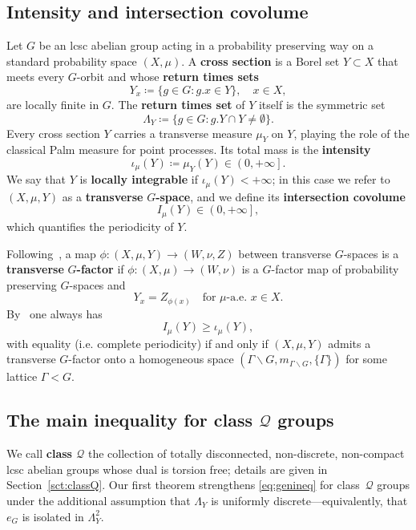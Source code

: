 \documentclass{amsart}
\numberwithin{equation}{subsection}
\theoremstyle{remark}
\begin{document}
\subsection{Intensity and intersection covolume}

Let \(G\) be an lcsc abelian group acting in a probability preserving way on a standard probability space \(\left(X,\mu\right)\). A {\bf cross section} is a Borel set \(Y\subset X\) that meets every \(G\)-orbit and whose {\bf return times sets} 
\[\left.Y_{x}\coloneqq\{g\in G: g.x\in Y\}, \quad x\in X,\right.\] 
are locally finite in \(G\). The {\bf return times set} of \(Y\) itself is the symmetric set 
\[\Lambda_{Y}\coloneqq\{g\in G: g.Y\cap Y\neq\emptyset\}.\] 
Every cross section \(Y\) carries a transverse measure \(\mu_{Y}\) on \(Y\), playing the role of the classical Palm measure for point processes. Its total mass is the {\bf intensity} 
\[\iota_{\mu}\left(Y\right)\coloneqq\mu_{Y}\left(Y\right)\in\left(0,+\infty\right].\] 
We say that \(Y\) is {\bf locally integrable} if \(\iota_{\mu}\left(Y\right)<+\infty\); in this case we refer to \(\left(X,\mu,Y\right)\) as a {\bf transverse} \(G\){\bf-space}, and we define its {\bf intersection covolume} 
\[I_{\mu}\left(Y\right)\in\left(0,+\infty\right],\] 
which quantifies the periodicity of \(Y\).

Following~\cite[\S5.2]{AvBjCuI}, a map \(\phi:\left(X,\mu,Y\right)\to\left(W,\nu,Z\right)\) between transverse \(G\)-spaces is a {\bf transverse} \(G\){\bf-factor} if \(\phi:\left(X,\mu\right)\to\left(W,\nu\right)\) is a \(G\)-factor map of probability preserving \(G\)-spaces and 
\[Y_{x}=Z_{\phi\left(x\right)} \quad\text{for }\mu\text{-a.e. }x\in X.\] 
By~\cite[Theorem~A]{AvBjCuI} one always has 
\begin{equation}\label{eq:genineq}
I_{\mu}\left(Y\right)\geq \iota_{\mu}\left(Y\right),
\end{equation}
with equality (i.e. complete periodicity) if and only if \(\left(X,\mu,Y\right)\) admits a transverse \(G\)-factor onto a homogeneous space \(\left(\Gamma\backslash G,m_{\Gamma\backslash G},\{\Gamma\}\right)\) for some lattice \(\Gamma<G\).

\subsection{The main inequality for class \(\mathcal{Q}\) groups}

We call {\bf class \(\mathcal{Q}\)} the collection of totally disconnected, non-discrete, non-compact lcsc abelian groups whose dual is torsion free; details are given in Section~\ref{sct:classQ}. Our first theorem strengthens \eqref{eq:genineq} for class~\(\mathcal{Q}\) groups under the additional assumption that \(\Lambda_{Y}\) is uniformly discrete—equivalently, that \(e_{G}\) is isolated in \(\Lambda_{Y}^{2}\).
\end{document}
